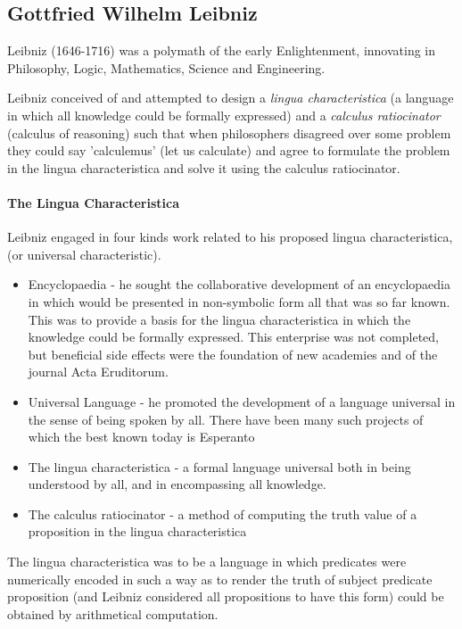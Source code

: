 \documentclass[10pt,titlepage]{book}
\begin{document}
\subsection{Gottfried Wilhelm Leibniz}

Leibniz (1646-1716) was a polymath of the early Enlightenment, innovating in Philosophy, Logic, Mathematics, Science and Engineering. 

Leibniz conceived of and attempted to design a \emph{lingua characteristica} (a language in which all knowledge could be formally expressed) and a \emph{calculus ratiocinator} (calculus of reasoning) such that when philosophers disagreed over some problem they could say 'calculemus' (let us calculate) and agree to formulate the problem in the lingua characteristica and solve it using the calculus ratiocinator.

\paragraph{The Lingua Characteristica}
Leibniz engaged in four kinds work related to his proposed lingua characteristica, (or universal characteristic).
\begin{itemize}
\item Encyclopaedia - he sought the collaborative development of an encyclopaedia in which would be presented in non-symbolic form all that was so far known. This was to provide a basis for the lingua characteristica in which the knowledge could be formally expressed. This enterprise was not completed, but beneficial side effects were the foundation of new academies and of the journal Acta Eruditorum.
\item Universal Language - he promoted the development of a language universal in the sense of being spoken by all. There have been many such projects of which the best known today is Esperanto
\item The lingua characteristica - a formal language universal both in being understood by all, and in encompassing all knowledge.
\item The calculus ratiocinator - a method of computing the truth value of a proposition in the lingua characteristica
\end{itemize}

  The lingua characteristica was to be a language in which predicates were numerically encoded in such a way as to render the truth of subject predicate proposition (and Leibniz considered all propositions to have this form) could be obtained by arithmetical computation.
\end{document}
